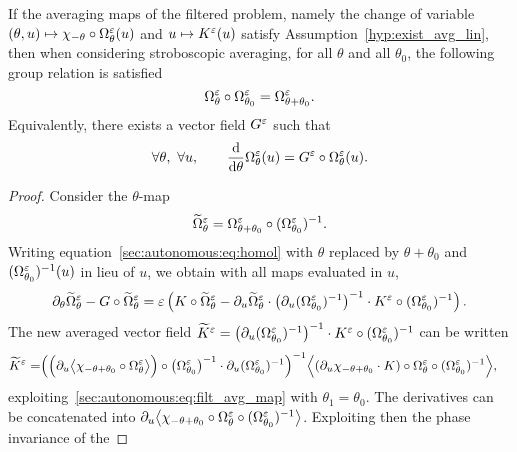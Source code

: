%

\begin{proposition} \label{sec:autonomous:prop:phigroup} %
  If the averaging maps of the filtered problem, namely the change of
  variable $(\theta,u) \mapsto \chi_{-\theta} \circ \Omega^\varepsilon
  _\theta(u)$ and $u \mapsto K^\varepsilon(u)$ satisfy
  Assumption~\ref{hyp:exist_avg_lin}, then when considering stroboscopic
  averaging, for all $\theta$ and all $\theta_0$, the following group
  relation is satisfied 
  $$
    \Omega^\varepsilon_{\theta} \circ \Omega^\varepsilon_{\theta_0} 
    = \Omega^\varepsilon_{\theta + \theta_0}.
  $$
  Equivalently, there exists a vector field $G^\varepsilon$ such that 
  $$
  \forall \theta, \ \forall u, \qquad 
  \frac{\mathrm{d}}{\mathrm{d} \theta} \Omega^\varepsilon_\theta(u) 
  = G^\varepsilon \circ \Omega^\varepsilon_\theta(u).
  $$
\end{proposition}
\begin{proof}
Consider the $\theta$-map  
$$
\widetilde \Omega^\varepsilon_{\theta} 
= \Omega^\varepsilon_{\theta+\theta_0} \circ (\Omega^\varepsilon_{\theta_0})^{-1}.
$$
Writing equation~\eqref{sec:autonomous:eq:homol} with $\theta$ replaced by
$\theta+\theta_0$ and $(\Omega^\varepsilon_{\theta_0})^{-1}(u)$ in lieu of $u$,
we obtain with all maps evaluated in $u$, 
\begin{equation} \label{sec:autonomous:eq:tilde_homol}
  \partial_\theta \widetilde\Omega^\varepsilon_{\theta}
  - G \circ \widetilde \Omega^\varepsilon_{\theta}
  = \varepsilon\left( K \circ \widetilde \Omega^\varepsilon_{\theta}
    - \partial_u \widetilde \Omega^\varepsilon_{\theta} \cdot 
      \left(\partial_u (\Omega^\varepsilon_{\theta_0})^{-1} \right)^{-1} \cdot 
      K^\varepsilon \circ (\Omega^\varepsilon_{\theta_0})^{-1} 
  \right) .
\end{equation}
The new averaged vector field $\widetilde{K}^\varepsilon = \left(\partial_u
(\Omega^\varepsilon_{\theta_0})^{-1}\right)^{-1} \cdot K^\varepsilon \circ
(\Omega^\varepsilon_{\theta_0})^{-1} $ can be written 
\begin{align*}
  \widetilde{K}^\varepsilon = &
  \Big( \Big( \partial_u \big \langle \chi_{-\theta+\theta_0} 
      \circ \Omega^\varepsilon _\theta \big \rangle \Big) 
    \circ \big( \Omega^\varepsilon_{\theta_0} \big)^{-1} \cdot
    \partial_u (\Omega^\varepsilon_{\theta_0})^{-1} \Big) ^{-1}
  \Big \langle (\partial_u \chi_{-\theta+\theta_0} \cdot K) 
    \circ \Omega^\varepsilon _\theta  \circ (\Omega^\varepsilon_{\theta_0})^{-1} \Big \rangle ,
\end{align*}
exploiting~\eqref{sec:autonomous:eq:filt_avg_map} with $\theta_1 =
\theta_0$. The derivatives can be concatenated into $\partial_u \big \langle
\chi_{-\theta + \theta_0} \circ \Omega^\varepsilon _\theta \circ (\Omega^\varepsilon
_{\theta_0})^{-1} \big \rangle$. Exploiting then the phase invariance of the

\end{proof}
